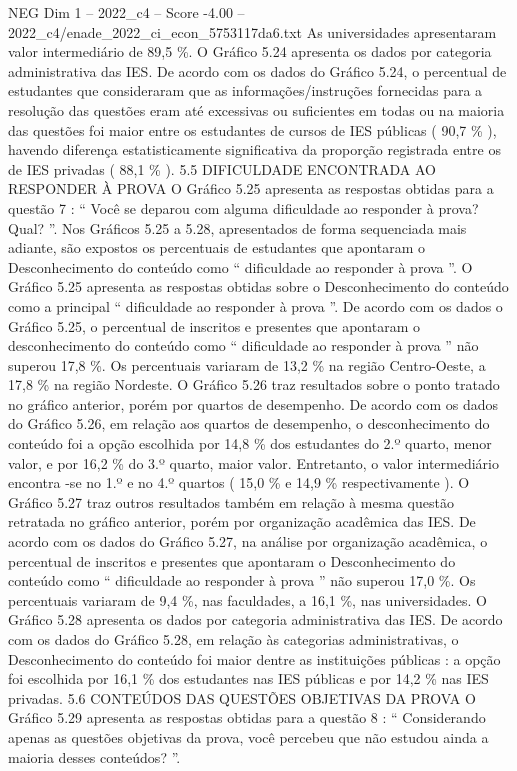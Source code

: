 \begin{textsample}{NEG Dim 1 – 2022\_c4 – Score -4.00 – 2022\_c4/enade\_2022\_ci\_econ\_5753117da6.txt}
As universidades apresentaram valor intermediário de 89,5 \%.
O Gráfico 5.24 apresenta os dados por categoria administrativa das IES.
De acordo com os dados do Gráfico 5.24, o percentual de estudantes que consideraram que as informações/instruções fornecidas para a resolução das questões eram até excessivas ou suficientes em todas ou na maioria das questões foi maior entre os estudantes de cursos de IES públicas ( 90,7 \% ), havendo diferença estatisticamente significativa da proporção registrada entre os de IES privadas ( 88,1 \% ). 5.5 DIFICULDADE ENCONTRADA AO RESPONDER À PROVA O Gráfico 5.25 apresenta as respostas obtidas para a questão 7 : “ Você se deparou com alguma dificuldade ao responder à prova?
Qual? ”.
Nos Gráficos 5.25 a 5.28, apresentados de forma sequenciada mais adiante, são expostos os percentuais de estudantes que apontaram o Desconhecimento do conteúdo como “ dificuldade ao responder à prova ”.
O Gráfico 5.25 apresenta as respostas obtidas sobre o Desconhecimento do conteúdo como a principal “ dificuldade ao responder à prova ”.
De acordo com os dados o Gráfico 5.25, o percentual de inscritos e presentes que apontaram o desconhecimento do conteúdo como “ dificuldade ao responder à prova ” não superou 17,8 \%.
Os percentuais variaram de 13,2 \% na região Centro-Oeste, a 17,8 \% na região Nordeste.
O Gráfico 5.26 traz resultados sobre o ponto tratado no gráfico anterior, porém por quartos de desempenho.
De acordo com os dados do Gráfico 5.26, em relação aos quartos de desempenho, o desconhecimento do conteúdo foi a opção escolhida por 14,8 \% dos estudantes do 2.º quarto, menor valor, e por 16,2 \% do 3.º quarto, maior valor.
Entretanto, o valor intermediário encontra -se no 1.º e no 4.º quartos ( 15,0 \% e 14,9 \% respectivamente ).
O Gráfico 5.27 traz outros resultados também em relação à mesma questão retratada no gráfico anterior, porém por organização acadêmica das IES.
De acordo com os dados do Gráfico 5.27, na análise por organização acadêmica, o percentual de inscritos e presentes que apontaram o Desconhecimento do conteúdo como “ dificuldade ao responder à prova ” não superou 17,0 \%.
Os percentuais variaram de 9,4 \%, nas faculdades, a 16,1 \%, nas universidades.
O Gráfico 5.28 apresenta os dados por categoria administrativa das IES.
De acordo com os dados do Gráfico 5.28, em relação às categorias administrativas, o Desconhecimento do conteúdo foi maior dentre as instituições públicas : a opção foi escolhida por 16,1 \% dos estudantes nas IES públicas e por 14,2 \% nas IES privadas. 5.6 CONTEÚDOS DAS QUESTÕES OBJETIVAS DA PROVA O Gráfico 5.29 apresenta as respostas obtidas para a questão 8 : “ Considerando apenas as questões objetivas da prova, você percebeu que não estudou ainda a maioria desses conteúdos? ”.

\end{textsample}
